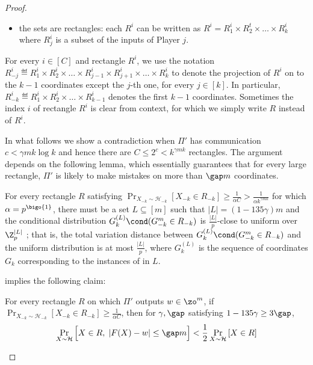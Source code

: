 \begin{proof}
\begin{claim}
\begin{itemize}
				\item the sets are rectangles: each $R^i$ can be written as $R^i=R_1^i\times R_2^t\times\ldots\times R_k^i$ where $R_j^i$ is a subset of the inputs of Player $j$.
			\end{itemize}
		\end{claim} 

		For every $i\in [C]$ and rectangle $R^i$, we use the notation $R^i_{-j}\eqdef R^i_{1} \times R^i_{2} \times \dots \times R^i_{j-1}\times R^i_{j+1}\times \dots \times R^i_k$ to denote the projection of $R^i$ on to the $k-1$ coordinates except the $j$-th one, for every $j\in[k]$. 
		In particular, $R^i_{-k}\eqdef R^i_{1} \times R^i_{2} \times \dots \times R^i_{k-1}$ denotes the first $k-1$ coordinates.
		Sometimes the index $i$ of rectangle $R^i$ is clear from context, for which we simply write $R$ instead of $R^i$.

		In what follows we show a contradiction when $\Pi'$ has communication $c<\gamma mk\log k$ and hence there are $C\le 2^c<k^{\gamma m k}$ rectangles.
		The argument depends on the following lemma, which essentially guarantees that for every large rectangle, $\Pi'$ is likely to make mistakes on more than $\gap m$ coordinates.


		\begin{lemma}\label{lem: partial uniform}
			For every rectangle $R$ satisfying $\Pr_{X_{-k} \sim \mathcal{H}_{-k}}[X_{-k}\in R_{-k}]\ge \frac{1}{\alpha C}>\frac{1}{\alpha k^{\gamma mk}}$ for which $\alpha= p^{\bigo{1}}$,
			there must be a set $L\subseteq [m]$ such that $|L|=(1-135\gamma) m$ and {\color{black}the conditional distribution}
			$G_k^{(L)}\cond (G_{-k}^m \in R_{-k})$ is $\frac{|L|}{p}$-close to uniform over $\Z_p^{|L|}$ {\color{black} ; that is, the total variation distance between $G_k^{(L)}\cond (G_{-k}^m \in R_{-k})$ and the uniform distribution is at most $\frac{|L|}{p}$}, {\color{black} where $G_k^{(L)}$ is the sequence of coordinates $G_k$ corresponding to the instances of \sumequal in $L$.}
		\end{lemma}


		 implies the following claim:

		\begin{claim}\label{claim:ball}
			For every rectangle $R$ on which $\Pi'$ outputs $w\in \zo^m$,
			if $\Pr_{X_{-k} \sim \mathcal{H}_{-k}}\left[X_{-k}\in R_{-k}\right]\ge \frac{1}{\alpha C}$, 
			then for $\gamma,\gap$ satisfying $1-135\gamma \ge 3\gap$, 
			\begin{equation}\label{ineq:ball}
				  \Pr_{X \sim \mathcal{H}}\Big[ X\in R,\; \left|F(X)-w\right|\le \gap m \Big] 
				< \frac{1}{2} \Pr_{X \sim \mathcal{H}}\left[ X\in R\right]
			\end{equation} 	
		\end{claim} 


\end{proof}

